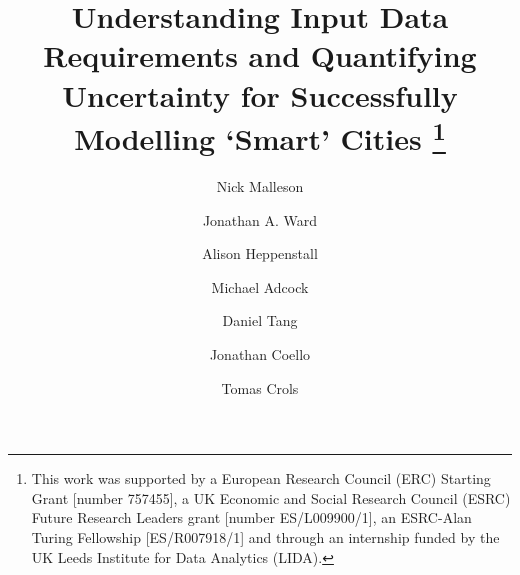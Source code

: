 \documentclass[runningheads]{llncs}
\begin{document}
%
\title{Understanding Input Data Requirements and Quantifying Uncertainty for Successfully Modelling `Smart' Cities 
\thanks{This work was supported by a European Research Council (ERC) Starting Grant [number 757455], a UK Economic and Social Research Council (ESRC) Future Research Leaders grant [number ES/L009900/1], an ESRC-Alan Turing Fellowship [ES/R007918/1] and through an internship funded by the UK Leeds Institute for Data Analytics (LIDA).}}

%
%

\author{Nick Malleson \and
Jonathan A. Ward \and
Alison Heppenstall \and
Michael Adcock \and
Daniel Tang  \and
Jonathan Coello \and
Tomas Crols
}
%
\end{document}
